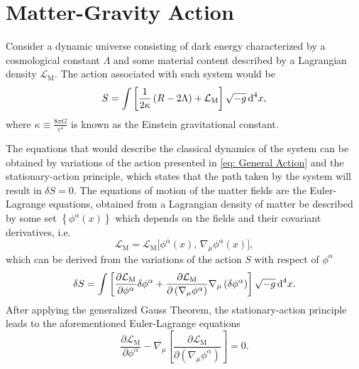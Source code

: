 \section{Matter-Gravity Action}
Consider a dynamic universe consisting of dark energy characterized by a cosmological constant $\Lambda$ and some material content described by a Lagrangian density $\mathcal{L}_{\text{M}}$. The action associated with such system would be
\begin{equation}\label{eq: General Action}
	S=\int\left[\frac{1}{2\kappa}\left(R-2\Lambda\right)+\mathcal{L}_{\text{M}}\right]\sqrt{-g}\,\text{d}^4 x,
\end{equation}
where $\kappa\equiv\frac{8\pi G}{c^4}$ is known as the Einstein gravitational constant.

The equations that would describe the classical dynamics of the system can be obtained by variations of the action presented in \cref{eq: General Action} and the stationary-action principle, which states that the path taken by the system will result in $\delta S=0$. The equations of motion of the matter fields are the Euler-Lagrange equations, obtained from a Lagrangian density of matter be described by some set $\left\{\phi^\alpha(x)\right\}$ which depends on the fields and their covariant derivatives, i.e.
\begin{equation}
	\mathcal{L}_{\text{M}}=\mathcal{L}_{\text{M}}\big[\phi^\alpha(x),\,\nabla_\mu\phi^\alpha(x)\big],
\end{equation}
which can be derived from the variations of the action $S$ with respect of $\phi^\alpha$
\begin{equation}
	\delta S=\int\left[\frac{\partial \mathcal{L}_\text{M}}{\partial \phi^\alpha}\delta\phi^\alpha+\frac{\partial \mathcal{L}_\text{M}}{\partial\left(\nabla_\mu\phi^\alpha\right)}\nabla_\mu\left(\delta\phi^\alpha\right)\right]\sqrt{-g}\,\text{d}^4x.
\end{equation}
After applying the generalized Gauss Theorem, the stationary-action principle leads to the aforementioned Euler-Lagrange equations
\begin{equation}\label{eq: Euler-Lagrange}
	\frac{\partial\mathcal{L}_{\text{M}}}{\partial\phi^\alpha}-\nabla_\mu\left[\frac{\partial \mathcal{L}_{\text{M}}}{\partial\left(\nabla_\mu\phi^\alpha\right)}\right]=0.
\end{equation}

